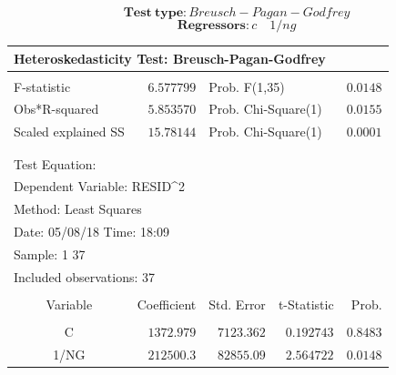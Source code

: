 \documentclass[12pt]{report}
\begin{document}
$$\textbf{Test}\ \textbf{type}: Breusch-Pagan-Godfrey$$
$$\textbf{Regressors}: c \quad 1/ng$$
\begin{table}[H]
	\centering
	\begin{tabular}{lrrrr}
		\multicolumn{5}{l}{Heteroskedasticity Test: Breusch-Pagan-Godfrey}\\
		[4.5pt] \hline \\ [-4.5pt]
		\multicolumn{1}{l}{F-statistic}&\multicolumn{1}{r}{$6.577799$}&\multicolumn{2}{l}{Prob. F(1,35)}&\multicolumn{1}{r}{$0.0148$}\\
		\multicolumn{1}{l}{Obs*R-squared}&\multicolumn{1}{r}{$5.853570$}&\multicolumn{2}{l}{Prob. Chi-Square(1)}&\multicolumn{1}{r}{$0.0155$}\\
		\multicolumn{1}{l}{Scaled explained SS}&\multicolumn{1}{r}{$15.78144$}&\multicolumn{2}{l}{Prob. Chi-Square(1)}&\multicolumn{1}{r}{$0.0001$}\\
		[4.5pt] \hline \\ [-4.5pt]
		\multicolumn{1}{c}{}&\multicolumn{1}{c}{}&\multicolumn{1}{c}{}&\multicolumn{1}{c}{}&\multicolumn{1}{c}{}\\
		\multicolumn{2}{l}{Test Equation:}&\multicolumn{1}{c}{}&\multicolumn{1}{c}{}&\multicolumn{1}{c}{}\\
		\multicolumn{3}{l}{Dependent Variable: RESID\textasciicircum 2}&\multicolumn{1}{c}{}&\multicolumn{1}{c}{}\\
		\multicolumn{3}{l}{Method: Least Squares}&\multicolumn{1}{c}{}&\multicolumn{1}{c}{}\\
		\multicolumn{3}{l}{Date: 05/08/18   Time: 18:09}&\multicolumn{1}{c}{}&\multicolumn{1}{c}{}\\
		\multicolumn{2}{l}{Sample: 1 37}&\multicolumn{1}{c}{}&\multicolumn{1}{c}{}&\multicolumn{1}{c}{}\\
		\multicolumn{3}{l}{Included observations: 37}&\multicolumn{1}{c}{}&\multicolumn{1}{c}{}\\
		[4.5pt] \hline \\ [-4.5pt]
		\multicolumn{1}{c}{Variable}&\multicolumn{1}{r}{Coefficient}&\multicolumn{1}{r}{Std. Error}&\multicolumn{1}{r}{t-Statistic}&\multicolumn{1}{r}{Prob.}\\
		[4.5pt] \hline \\ [-4.5pt]
		\multicolumn{1}{c}{C}&\multicolumn{1}{r}{$1372.979$}&\multicolumn{1}{r}{$7123.362$}&\multicolumn{1}{r}{$0.192743$}&\multicolumn{1}{r}{$0.8483$}\\
		\multicolumn{1}{c}{1/NG}&\multicolumn{1}{r}{$212500.3$}&\multicolumn{1}{r}{$82855.09$}&\multicolumn{1}{r}{$2.564722$}&\multicolumn{1}{r}{$0.0148$}\\

\end{tabular}
\end{table}
\end{document}
